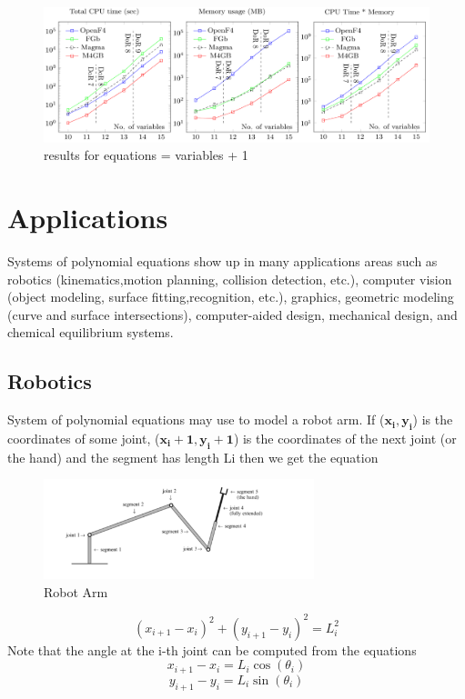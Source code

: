 \documentclass[11pt]{article}
\begin{document}
\begin{figure}[H]
  \begin{center}
    \includegraphics[width=\linewidth]{m4gb_m_n_1.png}
    \caption{results for equations = variables + 1}
    \label{fig:m4gb_m_n_1}
  \end{center}
\end{figure}
\section{Applications}
Systems of polynomial equations show up in many applications areas such as robotics (kinematics,motion planning, collision detection, etc.), computer vision (object modeling, surface fitting,recognition, etc.), graphics, geometric modeling (curve and surface intersections), computer-aided design, mechanical design, and chemical equilibrium systems. \cite{yanbinjiaArticle}
\subsection{Robotics}
System of polynomial equations may use to model a robot arm. If  ($\mathbf{x_i, y_i}$) is the coordinates of some joint,  ($\mathbf{x_i+1, y_i+1}$) is the coordinates of the next joint (or the hand) and the segment has length Li then we get the equation \cite{richterArticle}
\begin{figure}[H]
  \begin{center}
    \includegraphics[width=0.70\textwidth]{robotarm.png}
    \caption{Robot Arm}
    \label{fig: Robot Arm}
  \end{center}
\end{figure}

 \begin{equation}
    (x_{i+1}-x_i)^2 + (y_{i+1}-y_i)^2=L_i^2
\end{equation}
Note that the angle at the i-th joint can be computed from the equations
 \begin{equation}
    x_{i+1}-x_i = L_i \cos(\theta_i)
\end{equation}
 \begin{equation}
    y_{i+1}-y_i = L_i \sin(\theta_i)
\end{equation}
\end{document}
